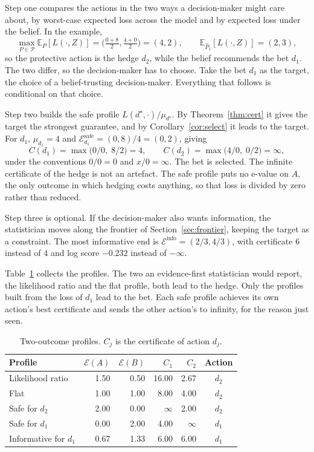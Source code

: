 Step one compares the actions in the two ways a decision-maker might care
about, by worst-case expected loss across the model and by expected loss under
the belief. In the example,
\[
  \max_{P\in\mathcal P}\mathbb E_{P}[L(\cdot,Z)]
     =\bigl(\tfrac{0+8}{2},\tfrac{4+0}{2}\bigr)=(4,2),
  \qquad
  \mathbb E_{\widehat P_1}[L(\cdot,Z)]=(2,3),
\]
so the protective action is the hedge $d_2$, while the belief recommends the
bet $d_1$. The two differ, so the decision-maker has to choose. Take the bet
$d_1$ as the target, the choice of a belief-trusting decision-maker.
Everything that follows is conditional on that choice.

Step two builds the safe profile $L(d^\star,\cdot)/\mu_{d^\star}$. By
Theorem~\ref{thm:cert} it gives the target the strongest guarantee, and by
Corollary~\ref{cor:select} it leads to the target. For $d_1$, $\mu_{d_1}=4$
and $\mathcal E^{\mathrm{safe}}_{d_1}=(0,8)/4=(0,2)$, giving
\[
  C(d_1)=\max\bigl(0/0,\;8/2\bigr)=4,
  \qquad
  C(d_2)=\max\bigl(4/0,\;0/2\bigr)=\infty,
\]
under the conventions $0/0=0$ and $x/0=\infty$. The bet is selected. The
infinite certificate of the hedge is not an artefact. The safe profile puts
no e-value on $A$, the only outcome in which hedging costs anything, so that
loss is divided by zero rather than reduced.

Step three is optional. If the decision-maker also wants information, the
statistician moves along the frontier of Section~\ref{sec:frontier}, keeping
the target as a constraint. The most informative end is
$\mathcal E^{\mathrm{info}}=(2/3,4/3)$, with certificate $6$ instead of $4$ and
log score $-0.232$ instead of $-\infty$.

Table~\ref{tab:two_toy} collects the profiles. The two an evidence-first
statistician would report, the likelihood ratio and the flat profile, both
lead to the hedge. Only the profiles built from the loss of $d_1$ lead to the
bet. Each safe profile achieves its own action's best certificate and sends
the other action's to infinity, for the reason just seen.

\begin{table}[H]
\centering
\caption{Two-outcome profiles. $C_j$ is the certificate of action $d_j$.}\label{tab:two_toy}
\begin{tabular}{@{}l r r r r c@{}}\toprule
Profile & $\mathcal E(A)$ & $\mathcal E(B)$ & $C_1$ & $C_2$ & Action \\\midrule
Likelihood ratio & 1.50 & 0.50 & 16.00 & 2.67 & $d_2$ \\
Flat & 1.00 & 1.00 & 8.00 & 4.00 & $d_2$ \\
Safe for $d_2$ & 2.00 & 0.00 & $\infty$ & 2.00 & $d_2$ \\
Safe for $d_1$ & 0.00 & 2.00 & 4.00 & $\infty$ & $d_1$ \\
Informative for $d_1$ & 0.67 & 1.33 & 6.00 & 6.00 & $d_1$ \\\bottomrule
\end{tabular}
\end{table}

